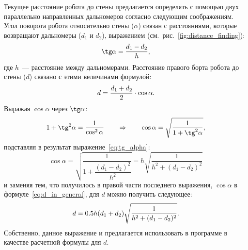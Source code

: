 \documentclass[12pt,a4paper,openany]{extarticle}
\begin{document}
Текущее расстояние робота до стены предлагается определять с помощью двух параллельно направленных дальномеров согласно следующим соображениям.
Угол поворота робота относительно стены ($\alpha$) связан с расстояниями, которые возвращают дальномеры ($d_1$ и $d_2$), выражением (см.~рис.~\ref{fig:distance_finding}):
\begin{equation}\label{eq:tg_alpha}
\tg\alpha = \frac{d_1-d_2}{h},
\end{equation}
где $h$~--- расстояние между дальномерами.
Расстояние правого борта робота до стены ($d$) связано с этими величинами формулой:
\begin{equation}\label{eq:d_in_general}
d = \frac{d_1+d_2}{2}\cdot\cos\alpha\ldotp
\end{equation}
Выражая $\cos\alpha$ через $\tg\alpha$:
\begin{equation}
1+\tg^2\alpha = \frac{1}{\cos^2\alpha} \qquad \Rightarrow \qquad \cos\alpha = \sqrt{\dfrac{1}{1+\tg^2\alpha}},
\end{equation}
подставляя в результат выражение~\eqref{eq:tg_alpha}:
\begin{equation}
\cos\alpha = \sqrt{\displaystyle \dfrac{1}{1 + \dfrac{(d_1 - d_2)^2}{h^2}}}=h\sqrt{\dfrac{1}{h^2+(d_1-d_2)^2}}
\end{equation}
и заменяя тем, что получилось в правой части последнего выражения, $\cos\alpha$ в формуле~\eqref{eq:d_in_general}, для $d$ можно получить следующее:
\begin{equation}
d = 0.5h(d_1+d_2)\sqrt{\dfrac{1}{h^2+(d_1-d_2)^2}}\ldotp
\end{equation}
Собственно, данное выражение и предлагается использовать в программе в качестве расчетной формулы для $d$.
\end{document}
